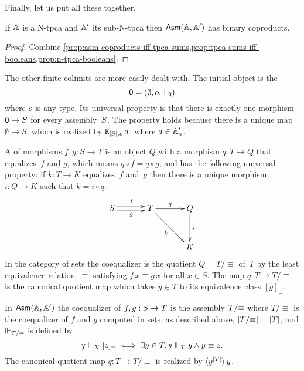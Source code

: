 \noindent
Finally, let us put all these together.

\begin{proposition}
  If $\AA$ is a N-tpca and $\subAA$ its sub-N-tpca then $\AsmA$ has
  binary coproducts.
\end{proposition}

\begin{proof}
  Combine \cref{prop:asm-coproducts-iff-tpca-sums,prop:tpca-sums-iff-booleans,prop:n-tpca-booleans}.
\end{proof}

The other finite colimits are more easily dealt with. The initial
object is the 
%
\begin{equation*}
  \zero = (\emptyset, o, \rz[\zero])
\end{equation*}
%
where $o$ is any type. Its universal property is that there is exactly one
morphism $\zero \to \asm{S}$ for every assembly~$\asm{S}$. The
property holds because there is a unique map $\emptyset \to S$, which
is realized by $\combK_{|S|,o}\,a$, where $a \in \subAtyp{o}$.

A  of morphisms $f, g : S \to T$ is an object $Q$
with a morphism $q : T \to Q$ that equalizes~$f$ and $g$, which means
$q \circ f = q \circ g$, and has the following universal property: if
$k : T \to K$ equalizes~$f$ and~$g$ then there is a unique morphism $i
: Q \to K$ such that $k = i \circ q$:
%
\begin{equation*}
  \xymatrix@+1em{
    {S}
    \ar@<+0.25em>[r]^{f}
    \ar@<-0.25em>[r]_{g}
    &
    {T}
    \ar[rd]_{k}
    \ar[r]^{q}
    &
    {Q}
    \ar[d]^{i}
    \\
    & & 
    {K}
  }
\end{equation*}
%
In the category of sets the coequalizer is the quotient $Q =
T/{\equiv}$ of~$T$ by the least equivalence relation~$\equiv$
satisfying $f\,x \equiv g\,x$ for all $x \in S$. The map $q : T \to
T/{\equiv}$ is the canonical quotient map which takes $y \in T$ to its
equivalence class $[y]_{\equiv}$.

In $\AsmA$ the coequalizer of $f, g : \asm{S} \to \asm{T}$ is the
assembly $\asm{T}/{\equiv}$ where $T/{\equiv}$ is the coequalizer of
$f$ and $g$ computed in sets, as described above, $|\asm{T}/{\equiv}|
= |T|$, and $\rz[T/{\equiv}]$ is defined by
%
\begin{equation*}
  \R{y} \rz[X] [z]_{\equiv} \iff
  \some{y \in T} \R{y} \rz[T] y \land y \equiv z.
\end{equation*}
%
The canonical quotient map $q : T \to T/{\equiv}$ is realized by
$\tpcalam{y}{|T|} y$.

